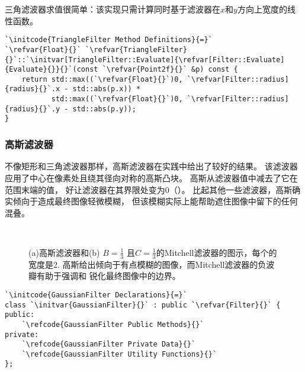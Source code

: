 三角滤波器求值很简单：该实现只需计算同时基于滤波器在$x$和$y$方向上宽度的线性函数。
\begin{lstlisting}
`\initcode{TriangleFilter Method Definitions}{=}`
`\refvar{Float}{}` `\refvar{TriangleFilter}{}`::`\initvar[TriangleFilter::Evaluate]{\refvar[Filter::Evaluate]{Evaluate}{}}{}`(const `\refvar{Point2f}{}` &p) const {
    return std::max((`\refvar{Float}{}`)0, `\refvar[Filter::radius]{radius}{}`.x - std::abs(p.x)) *
           std::max((`\refvar{Float}{}`)0, `\refvar[Filter::radius]{radius}{}`.y - std::abs(p.y));
}
\end{lstlisting}

\subsubsection*{高斯滤波器}
不像矩形和三角滤波器那样，高斯滤波器在实践中给出了较好的结果。
该滤波器应用了中心在像素处且绕其径向对称的高斯凸块。
高斯从滤波器值中减去了它在范围末端的值，
好让滤波器在其界限处变为0（）。
比起其他一些滤波器，高斯确实倾向于造成最终图像轻微模糊，
但该模糊实际上能帮助遮住图像中留下的任何混叠。

\begin{figure}[htbp]
    \centering
    \,
    \caption{(a)高斯滤波器和(b) $\displaystyle B=\frac{1}{3}$
        且$\displaystyle C=\frac{1}{3}$的Mitchell滤波器的图示，每个的宽度是2.
        高斯给出倾向于有点模糊的图像，而Mitchell滤波器的负波瓣有助于强调和
        锐化最终图像中的边界。}
    \label{fig:7.43}
\end{figure}

\begin{lstlisting}
`\initcode{GaussianFilter Declarations}{=}`
class `\initvar{GaussianFilter}{}` : public `\refvar{Filter}{}` {
public:
    `\refcode{GaussianFilter Public Methods}{}`
private:
    `\refcode{GaussianFilter Private Data}{}`
    `\refcode{GaussianFilter Utility Functions}{}`
};
\end{lstlisting}

